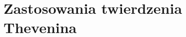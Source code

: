 \documentclass[polish,polish,a4paper]{article}
\begin{document}
\begin{spacing}{2}
\begin{figure}[H]
\begin{equation*}
\begin{array}{|c|c|c|c|c|c|c|}
			\end{array}
			\end{equation*}
		\end{figure}
	\section{Zastosowania twierdzenia Thevenina}
	
		\newpage
		
	\tableofcontents
		
	\end{spacing}
\end{document}
